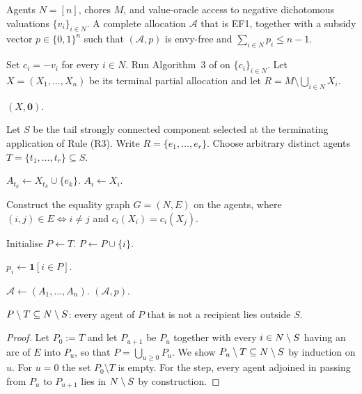 \begin{algorithm}[H]
\caption{EF1 allocation with at most one unit of subsidy per agent for negative dichotomous valuations}
\label{alg:main}
\begin{algorithmic}[1]
\Require Agents $N=[n]$, chores $M$, and value-oracle access to negative
dichotomous valuations $\{v_i\}_{i\in N}$.
\Ensure A complete allocation $\mathcal{A}$ that is EF1, together with a
subsidy vector $p\in\{0,1\}^n$ such that $(\mathcal{A},p)$ is envy-free and
$\sum_{i\in N}p_i\le n-1$.

\State Set $c_i=-v_i$ for every $i\in N$.
\State Run Algorithm~3 of \cite{TWYZ23} on $\{c_i\}_{i\in N}$.
\State Let $X=(X_1,\ldots,X_n)$ be its terminal partial allocation and
      let $R=M\setminus\bigcup_{i\in N}X_i$.

    \State \Return $(X,\mathbf{0})$.
\EndIf

\State Let $S$ be the tail strongly connected component selected at the
      terminating application of Rule (R3).
\State Write $R=\{e_1,\ldots,e_r\}$.
\State Choose arbitrary distinct agents
      $T=\{t_1,\ldots,t_r\}\subseteq S$.

    \State $A_{t_k}\gets X_{t_k}\cup\{e_k\}$.
\EndFor
{}
    \State $A_i\gets X_i$.
\EndFor

\State Construct the equality graph $G=(N,E)$ on the agents, where
\Statex \qquad $(i,j)\in E \iff i\neq j$ and $c_i(X_i)=c_i(X_j)$.

\State Initialise $P\gets T$.
    \State $P\gets P\cup\{i\}$.
\EndWhile

    \State $p_i\gets \mathbf{1}[i\in P]$.
\EndFor

\State $\mathcal{A}\gets(A_1,\ldots,A_n)$.
\State \Return $(\mathcal{A},p)$.
\end{algorithmic}
\end{algorithm}
\begin{lemma}
\label{lem:m-Pstructure}
$P \setminus T \subseteq N \setminus S$: every agent of $P$ that is not a
recipient lies outside $S$.
\end{lemma}

\begin{proof}
Let $P_0 := T$ and let $P_{u+1}$ be $P_u$ together with every
$i \in N \setminus S$ having an arc of $E$ into $P_u$, so that
$P = \bigcup_{u \ge 0} P_u$. We show $P_u \setminus T \subseteq N
\setminus S$ by induction on $u$. For $u = 0$ the set $P_0 \setminus T$ is
empty. For the step, every agent adjoined in passing from $P_u$ to $P_{u+1}$
lies in $N \setminus S$ by construction.
\end{proof}

